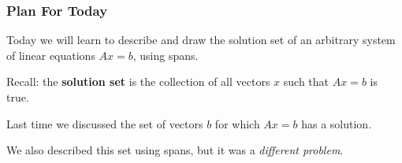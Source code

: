 



\begin{frame}
\frametitle{Plan For Today}

Today we will learn to describe and draw the solution set of an arbitrary system
of linear equations $Ax=b$, using spans.

\begin{center}
\end{center}

\pause
\alert{Recall:} the \textbf{solution set} is the collection of all vectors $x$
such that $Ax=b$ is true.

\pause\bigskip
Last time we discussed the set of vectors $b$ for which $Ax=b$ has a solution.

\pause\bigskip
We also described this set using spans, but it was a
\emph{different problem}.

\end{frame}



